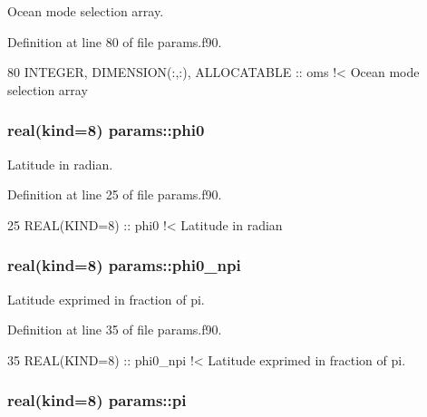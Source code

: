 Ocean mode selection array. 



Definition at line 80 of file params.\+f90.


\begin{DoxyCode}
80   \textcolor{keywordtype}{INTEGER}, \textcolor{keywordtype}{DIMENSION(:,:)}, \textcolor{keywordtype}{ALLOCATABLE} :: oms\textcolor{comment}{   !< Ocean mode selection array}
\end{DoxyCode}
\subsubsection[{\texorpdfstring{phi0}{phi0}}]{\setlength{\rightskip}{0pt plus 5cm}real(kind=8) params\+::phi0}\hypertarget{namespaceparams_a7e58166ca3fb2153f781aa623c5c31e6}{}\label{namespaceparams_a7e58166ca3fb2153f781aa623c5c31e6}


Latitude in radian. 



Definition at line 25 of file params.\+f90.


\begin{DoxyCode}
25   \textcolor{keywordtype}{REAL(KIND=8)} :: phi0\textcolor{comment}{      !< Latitude in radian}
\end{DoxyCode}
\subsubsection[{\texorpdfstring{phi0\+\_\+npi}{phi0_npi}}]{\setlength{\rightskip}{0pt plus 5cm}real(kind=8) params\+::phi0\+\_\+npi}\hypertarget{namespaceparams_a516e6c305e938087cfe780629c76ef64}{}\label{namespaceparams_a516e6c305e938087cfe780629c76ef64}


Latitude exprimed in fraction of pi. 



Definition at line 35 of file params.\+f90.


\begin{DoxyCode}
35   \textcolor{keywordtype}{REAL(KIND=8)} :: phi0\_npi\textcolor{comment}{  !< Latitude exprimed in fraction of pi.}
\end{DoxyCode}
\subsubsection[{\texorpdfstring{pi}{pi}}]{\setlength{\rightskip}{0pt plus 5cm}real(kind=8) params\+::pi}\hypertarget{namespaceparams_aaed8cf35d6e94ec5a9aeab80125e470f}{}\label{namespaceparams_aaed8cf35d6e94ec5a9aeab80125e470f}



